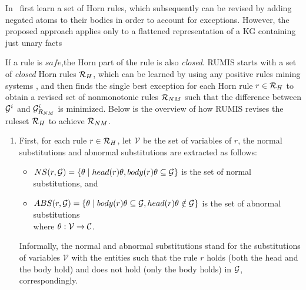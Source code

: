  In~\cite{gad2016} first learn a set of Horn rules, which subsequently can be revised by
adding negated atoms to their bodies in order to account for exceptions. However, the
proposed approach applies only to a flattened representation of a KG containing just
unary facts

 If a rule is $safe$,the Horn part of the rule is also \textit{closed}. RUMIS starts with a set of \textit{closed} Horn rules $\mathcal{R}_H$, which can be learned by using any positive rules mining systems \cite{amie,op,rdf2rules}, and then finds the single best exception for each Horn rule $r \in \mathcal{R}_H$ to obtain a revised set of nonmonotonic rules $\mathcal{R}_{NM}$ such that the difference between $\mathcal{G}^i$ and $\mathcal{G}^i_{R_{NM}}$ is minimized. Below is the overview of how RUMIS revises the ruleset $\mathcal{R}_H$ to achieve $\mathcal{R}_{NM}$.
\begin{enumerate}
\item First, for each rule $r \in \mathcal{R}_H$, let $\mathcal{V}$ be the set of variables of $r$, the normal substitutions and abnormal substitutions are extracted as follows:
\begin{itemize}
\item $NS(r, \mathcal{G}) = \{\theta \mid head(r)\theta, body(r)\theta \subseteq \mathcal{G}\}$ is the set of normal substitutions, and
\item $ABS(r, \mathcal{G}) = \{\theta \mid body(r)\theta \subseteq \mathcal{G} , head(r)\theta \notin \mathcal{G}\}$ is the set of abnormal substitutions\\
where $\theta: \mathcal{V} \rightarrow \mathcal{C}$.
\end{itemize}
Informally, the normal and abnormal substitutions stand for the substitutions of variables $\mathcal{V}$ with the entities such that the rule $r$ holds (both the head and the body hold) and does not hold (only the body holds) in $\mathcal{G}$, correspondingly.


\end{enumerate}
